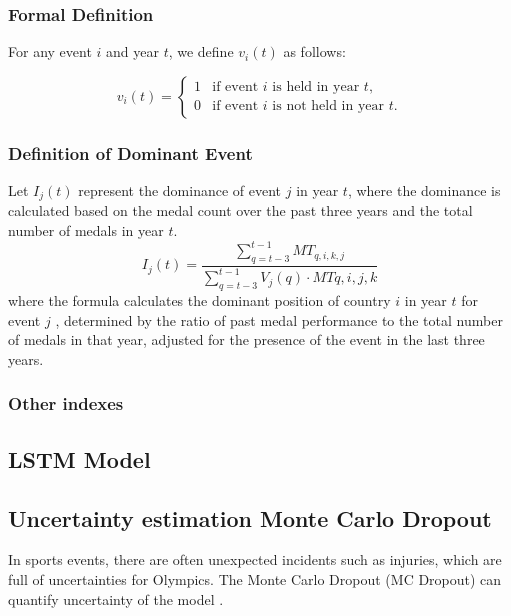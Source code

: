 \documentclass{mcmthesis}
\begin{document}
\subsubsection{Formal Definition}

For any event \( i \) and year \( t \), we define \( v_i(t) \) as follows:

\[
v_i(t) =
\begin{cases}
	1 & \text{if event } i \text{ is held in year } t, \\
	0 & \text{if event } i \text{ is not held in year } t.
\end{cases}
\]


\subsubsection{Definition of Dominant Event}

Let \( I_j(t) \) represent the dominance of event \( j \) in year \( t \), where the dominance is calculated based on the medal count over the past three years and the total number of medals in year \( t \).
\[
I_j(t) = \frac{\sum_{q=t-3}^{t-1} MT_{q,i,k,j}}{\sum_{q=t-3}^{t-1}V_j(q) \cdot MT{q,i,j,k}} 
\]
where the formula calculates the dominant position of country $i$ in year  $t$  for event  $j$ , determined by the ratio of past medal performance to the total number of medals in that year, adjusted for the presence of the event in the last three years.







\subsubsection{Other indexes}




\subsection{LSTM Model}

\subsection{Uncertainty estimation Monte Carlo Dropout}


In sports events, there are often unexpected incidents such as injuries, which are full of uncertainties for Olympics. The Monte Carlo Dropout (MC Dropout) can quantify uncertainty of the model \cite{gal2016dropout}.
\end{document}
